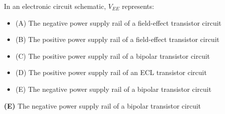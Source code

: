 

In an electronic circuit schematic, $V_{EE}$ represents:

\begin{itemize}
\item{(A)} The negative power supply rail of a field-effect transistor circuit
\vskip 5pt 
\item{(B)} The positive power supply rail of a field-effect transistor circuit
\vskip 5pt 
\item{(C)} The positive power supply rail of a bipolar transistor circuit
\vskip 5pt 
\item{(D)} The positive power supply rail of an ECL transistor circuit
\vskip 5pt 
\item{(E)} The negative power supply rail of a bipolar transistor circuit
\end{itemize}







{\bf (E)} The negative power supply rail of a bipolar transistor circuit
 










